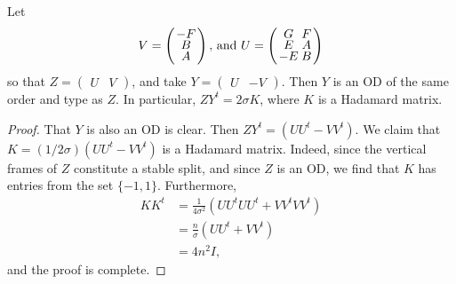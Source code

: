 \documentclass[../../../main]{subfiles}
\begin{document}
\begin{prop}
 Let
 \[
 \arraycolsep=1.25pt\def\arraystretch{0.625}
  V=\left(\begin{array}{c} -F\\B\\A \end{array}\right) \text{, and } 
  \arraycolsep=1.25pt\def\arraystretch{0.625}
  U=\left(\begin{array}{cc} G&F\\E&A\\-E&B \end{array}\right)
 \]
 so that $Z=\left(\begin{smallmatrix} U&V \end{smallmatrix}\right)$, and take $Y=\left(\begin{smallmatrix} U&-V \end{smallmatrix}\right)$. Then $Y$ is an OD of the same order and type as $Z$. In particular, $ZY^t=2\sigma K$, where $K$ is a Hadamard matrix.
\end{prop}

\begin{proof}
 That $Y$ is also an OD is clear. Then $ZY^t=(UU^t-VV^t)$. We claim that $K=(1/2\sigma)(UU^t-VV^t)$ is a Hadamard matrix. Indeed, since the vertical frames of $Z$ constitute a stable split, and since $Z$ is an OD, we find that $K$ has entries from the set $\{-1,1\}$. Furthermore,
 \begin{align*}
  KK^t &= \frac{1}{4\sigma^2}(UU^tUU^t+VV^tVV^t) \\
  &= \frac{n}{\sigma}(UU^t+VV^t) \\
  &= 4n^2 I,
 \end{align*}
 and the proof is complete.
\end{proof}
 
\biblio
\end{document}
